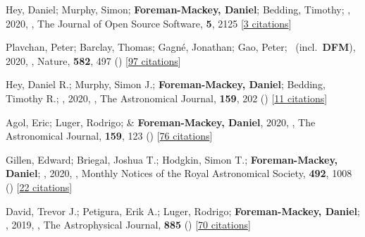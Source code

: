 \item[{\color{numcolor}\scriptsize56}] Hey, Daniel; Murphy, Simon; \textbf{Foreman-Mackey, Daniel}; Bedding, Timothy; \etal, 2020, , The Journal of Open Source Software, \textbf{5}, 2125 [\href{https://ui.adsabs.harvard.edu/abs/2020JOSS....5.2125H}{3 citations}]

\item[{\color{numcolor}\scriptsize55}] Plavchan, Peter; Barclay, Thomas; Gagn{\'e}, Jonathan; Gao, Peter; \etal\ (incl.\ \textbf{DFM}), 2020, , Nature, \textbf{582}, 497 () [\href{https://ui.adsabs.harvard.edu/abs/2020Natur.582..497P}{97 citations}]

\item[{\color{numcolor}\scriptsize54}] Hey, Daniel R.; Murphy, Simon J.; \textbf{Foreman-Mackey, Daniel}; Bedding, Timothy R.; \etal, 2020, , The Astronomical Journal, \textbf{159}, 202 () [\href{https://ui.adsabs.harvard.edu/abs/2020AJ....159..202H}{11 citations}]

\item[{\color{numcolor}\scriptsize53}] Agol, Eric; Luger, Rodrigo; \& \textbf{Foreman-Mackey, Daniel}, 2020, , The Astronomical Journal, \textbf{159}, 123 () [\href{https://ui.adsabs.harvard.edu/abs/2020AJ....159..123A}{76 citations}]

\item[{\color{numcolor}\scriptsize52}] Gillen, Edward; Briegal, Joshua T.; Hodgkin, Simon T.; \textbf{Foreman-Mackey, Daniel}; \etal, 2020, , Monthly Notices of the Royal Astronomical Society, \textbf{492}, 1008 () [\href{https://ui.adsabs.harvard.edu/abs/2020MNRAS.492.1008G}{22 citations}]

\item[{\color{numcolor}\scriptsize51}] David, Trevor J.; Petigura, Erik A.; Luger, Rodrigo; \textbf{Foreman-Mackey, Daniel}; \etal, 2019, , The Astrophysical Journal, \textbf{885} () [\href{https://ui.adsabs.harvard.edu/abs/2019ApJ...885L..12D}{70 citations}]


